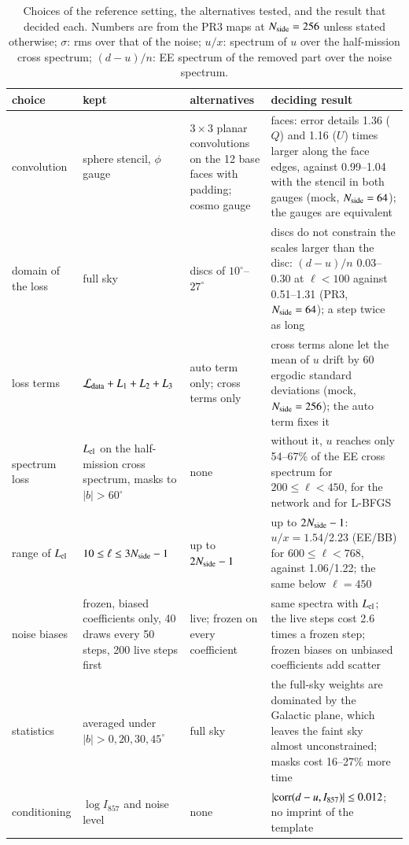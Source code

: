 \documentclass{aa}
\newcommand{\nside}{N_{\rm side}}
\begin{document}
\begin{table}
  \caption{Choices of the reference setting, the alternatives tested, and the result that decided each. Numbers are from the PR3 maps at $\nside=256$ unless stated otherwise; $\sigma$: rms over that of the noise; $u/x$: spectrum of $u$ over the half-mission cross spectrum; $(d-u)/n$: EE spectrum of the removed part over the noise spectrum.}
  \label{tab:choices}
  \centering
  \footnotesize
  \begin{tabular}{p{2.6cm}p{3.3cm}p{4.2cm}p{6.6cm}}
    \hline\hline
    choice & kept & alternatives & deciding result \\
    \hline
    convolution & sphere stencil, $\phi$ gauge & $3\times3$ planar convolutions on the 12 base faces with padding; cosmo gauge & faces: error details 1.36 ($Q$) and 1.16 ($U$) times larger along the face edges, against 0.99--1.04 with the stencil in both gauges (mock, $\nside=64$); the gauges are equivalent \\
    domain of the loss & full sky & discs of $10^\circ$--$27^\circ$ & discs do not constrain the scales larger than the disc: $(d-u)/n$ 0.03--0.30 at $\ell<100$ against 0.51--1.31 (PR3, $\nside=64$); a step twice as long \\
    loss terms & $\mathcal{L}_{\rm data}+L_1+L_2+L_3$ & auto term only; cross terms only & cross terms alone let the mean of $u$ drift by 60 ergodic standard deviations (mock, $\nside=256$); the auto term fixes it \\
    spectrum loss & $L_{\rm cl}$ on the half-mission cross spectrum, masks to $|b|>60^\circ$ & none & without it, $u$ reaches only 54--67\% of the EE cross spectrum for $200\le\ell<450$, for the network and for L-BFGS \\
    range of $L_{\rm cl}$ & $10\le\ell\le3\nside-1$ & up to $2\nside-1$ & up to $2\nside-1$: $u/x=1.54$/2.23 (EE/BB) for $600\le\ell<768$, against 1.06/1.22; the same below $\ell=450$ \\
    noise biases & frozen, biased coefficients only, 40 draws every 50 steps, 200 live steps first & live; frozen on every coefficient & same spectra with $L_{\rm cl}$; the live steps cost 2.6 times a frozen step; frozen biases on unbiased coefficients add scatter \\
    statistics & averaged under $|b|>0,20,30,45^\circ$ & full sky & the full-sky weights are dominated by the Galactic plane, which leaves the faint sky almost unconstrained; masks cost 16--27\% more time \\
    conditioning & $\log I_{857}$ and noise level & none & $|{\rm corr}(d-u,I_{857})|\le0.012$; no imprint of the template \\

\end{tabular}
\end{table}
\end{document}
